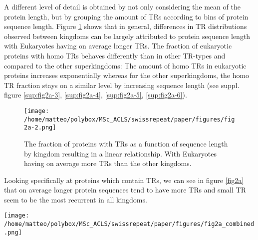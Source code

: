 \documentclass[a4,center,fleqn]{NAR}
\begin{document}
A different level of detail is obtained by not only considering the mean of the protein length, but by grouping the amount of TRs according to bins of protein sequence length.
Figure \ref{fig2a-2} shows that in general, differences in TR distributions observed between kingdoms can be largely attributed to protein sequence length with Eukaryotes having on average longer TRs.
The fraction of eukaryotic proteins with homo TRs behaves differently than in other TR-types and compared to the other superkingdoms: The amount of homo TRs in eukaryotic proteins increases exponentially whereas for the other superkingdoms, the homo TR fraction stays on a similar level by increasing sequence length (see suppl. figure \ref{sup:fig2a-3}, \ref{sup:fig2a-4}, \ref{sup:fig2a-5}, \ref{sup:fig2a-6}).

\begin{figure}[t]
\begin{center}
\texttt{[image: /home/matteo/polybox/MSc\_ACLS/swissrepeat/paper/figures/fig2a-2.png]}
\end{center}
\caption{The fraction of proteins with TRs as a function of sequence length by kingdom resulting in a linear relationship. With Eukaryotes having on average more TRs than the other kingdoms.}
\label{fig2a-2}
\end{figure}

Looking specifically at proteins which contain TRs, we can see in figure \ref{fig2a} that on average longer protein sequences tend to have more TRs and small TR seem to be the most recurrent in all kingdoms.


\begin{figure*}[t]
\begin{center}
\texttt{[image: /home/matteo/polybox/MSc\_ACLS/swissrepeat/paper/figures/fig2a\_combined.png]}
\end{center}
\caption{The amount of TRs (normalized by the amount of protein entries  of the species) is displayed separately for each TR-type as a function of the mean length of the proteins. It can clearly be seen, that TRs appear mostly as small TRs. Comparing the fraction of TRs kingdom-wise, some clear tendencies can be seen for micro- and small TRs. For example, chloroplastic proteins with unknown Kingdom (better: different Kingdoms?)tend to have few TRs and short mean protein length. Where in contrast mitochondrial proteins from Viridiplantae and Fungi tend to have many TRs and long mean protein length.}
\label{fig2a}
\end{figure*}
\end{document}
